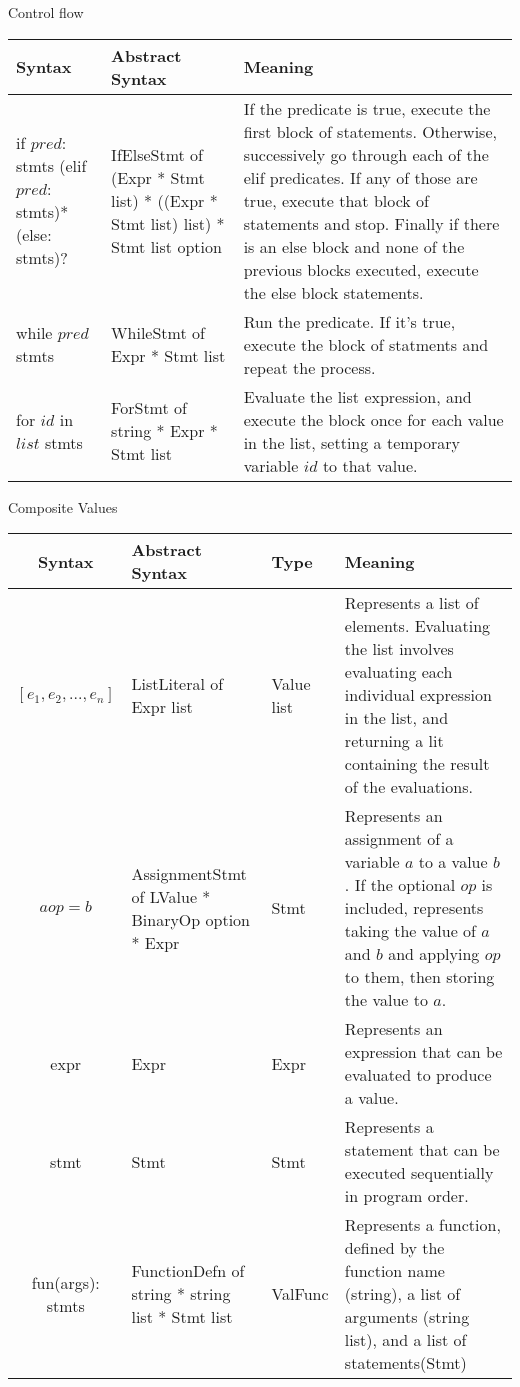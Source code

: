 \documentclass{article}
\begin{document}
Control flow
\begin{center}
 \begin{tabularx}{\linewidth}{|X|X|X|} 
 \hline
 Syntax & Abstract Syntax & Meaning \\
 \hline
 if $pred$: stmts (elif $pred$: stmts)* (else: stmts)? & IfElseStmt of (Expr * Stmt list) * ((Expr * Stmt list) list) * Stmt list option & If the predicate is true, execute the first block of statements. Otherwise, successively go through each of the elif predicates. If any of those are true, execute that block of statements and stop. Finally if there is an else block and none of the previous blocks executed, execute the else block statements. \\ 
 \hline
 while $pred$ stmts & WhileStmt of Expr * Stmt list & Run the predicate. If it's true, execute the block of statments and repeat the process. \\
 \hline
 for $id$ in $list$ stmts & ForStmt of string * Expr * Stmt list & Evaluate the list expression, and execute the block once for each value in the list, setting a temporary variable $id$ to that value. \\
 \hline
\end{tabularx}
\end{center}

Composite Values
\begin{center}
 \begin{tabularx}{\linewidth}{|c|X|X|X|} 
 \hline
 Syntax & Abstract Syntax & Type & Meaning \\
 \hline
 $[e_1, e_2, ..., e_n]$ & ListLiteral of Expr list & Value list & Represents a list of elements. Evaluating the list involves evaluating each individual expression in the list, and returning a lit containing the result of the evaluations. \\ 
 \hline
 $a op= b$ & AssignmentStmt of LValue * BinaryOp option * Expr & Stmt & Represents an assignment of a variable $a$ to a value $b$. If the optional $op$ is included, represents taking the value of $a$ and $b$ and applying $op$ to them, then storing the value to $a$. \\
 \hline
 expr & Expr & Expr & Represents an expression that can be evaluated to produce a value. \\
 \hline
 stmt & Stmt & Stmt & Represents a statement that can be executed sequentially in program order. \\
 \hline
 fun(args): stmts & FunctionDefn of string * string list * Stmt list & ValFunc & Represents a function, defined by the function name (string), a list of arguments (string list), and a list of statements(Stmt) \\
 \hline
\end{tabularx}
\end{center}
\end{document}
